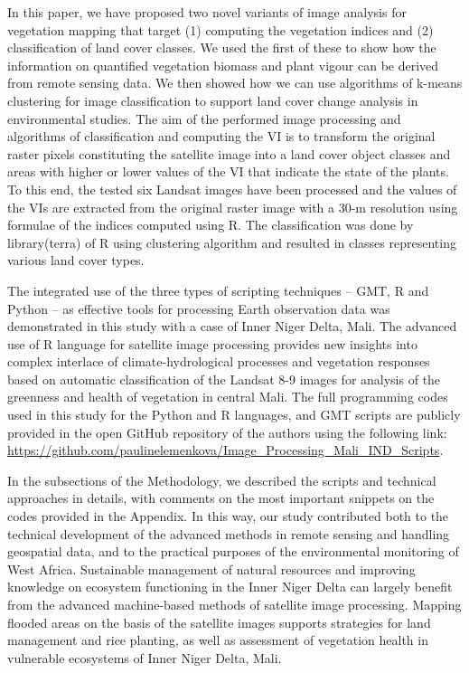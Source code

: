 \documentclass[12pt,a4paper,oneside]{article}
\def \newpar{\vspace{6pt}}
\begin{document}
\newpar In this paper, we have proposed two novel variants of image analysis for vegetation mapping that target (1) computing the vegetation indices and (2) classification of land cover classes. We used the first of these to show how the information on quantified vegetation biomass and plant vigour can be derived from remote sensing data. We then showed how we can use algorithms of k-means clustering for image classification to support land cover change analysis in environmental studies. The aim of the performed image processing and algorithms of classification and computing the VI is to transform the original raster pixels constituting the satellite image into a land cover object classes and areas with higher or lower values of the VI that indicate the state of the plants. To this end, the tested six Landsat images have been processed and the values of the VIs are extracted from the original raster image with a 30-m resolution using formulae of the indices computed using R. The classification was done by library(terra) of R using clustering algorithm and resulted in classes representing various land cover types.

\newpar The integrated use of the three types of scripting techniques -- GMT, R and Python -- as effective tools for processing Earth observation data was demonstrated in this study with a case of Inner Niger Delta, Mali. The advanced use of R language for satellite image processing provides new insights into complex interlace of climate-hydrological processes and vegetation responses based on automatic classification of the Landsat 8-9 images for analysis of the greenness and health of vegetation in central Mali. The full programming codes used in this study for the Python and R languages, and GMT scripts are publicly provided in the open GitHub repository of the authors using the following link: \href{https://github.com/paulinelemenkova/Image_Processing_Mali_IND_Scripts}{https://github.com/paulinelemenkova/Image\_Processing\_Mali\_IND\_Scripts}. 

\newpar In the subsections of the Methodology, we described the scripts and technical approaches in details, with comments on the most important snippets on the codes provided in the Appendix. In this way, our study contributed both to the technical development of the advanced methods in remote sensing and handling geospatial data, and to the practical purposes of the environmental monitoring of West Africa. Sustainable management of natural resources and improving knowledge on ecosystem functioning in the Inner Niger Delta can largely benefit from the advanced machine-based methods of satellite image processing. Mapping flooded areas on the basis of the satellite images supports strategies for land management and rice planting, as well as assessment of vegetation health in vulnerable ecosystems of Inner Niger Delta, Mali. 
\end{document}
